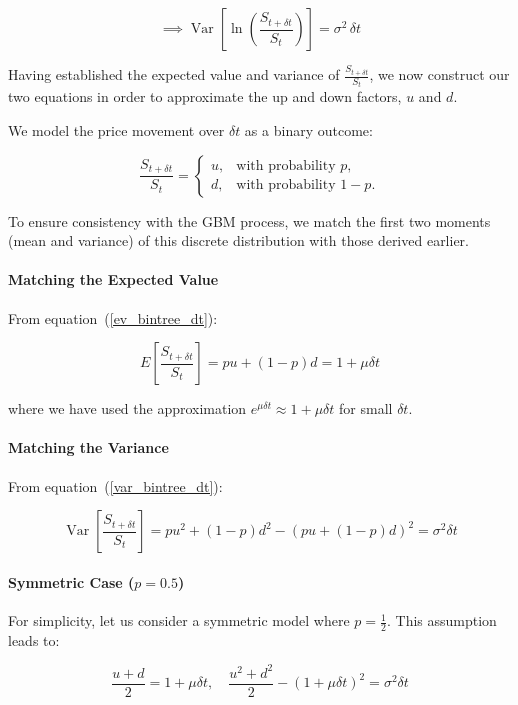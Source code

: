 \documentclass{article}
\begin{document}
    \begin{equation}
        \label{var_bintree_dt}
        \implies \operatorname{Var}\!\left[\ln\!\left(\frac{S_{t+\delta t}}{S_t}\right)\right] = \sigma^2\, \delta t
    \end{equation}

    Having established the expected value and variance of \( \frac{S_{t+\delta t}}{S_t} \), we now  construct our two equations in order to approximate the up and down factors, \( u \) and \( d \).

We model the price movement over \( \delta t \) as a binary outcome:

\[
    \frac{S_{t+\delta t}}{S_t} = 
    \begin{cases}
        u, & \text{with probability } p, \\
        d, & \text{with probability } 1 - p.
    \end{cases}
\]

To ensure consistency with the GBM process, we match the first two moments (mean and variance) of this discrete distribution with those derived earlier.

\paragraph{Matching the Expected Value}
From equation~(\ref{ev_bintree_dt}):

\[
    E\!\left[\frac{S_{t+\delta t}}{S_t}\right] = p u + (1 - p) d = 1 + \mu \delta t
\]

where we have used the approximation \( e^{\mu \delta t} \approx 1 + \mu \delta t \) for small \( \delta t \).

\paragraph{Matching the Variance}
From equation~(\ref{var_bintree_dt}):

\[
    \operatorname{Var}\!\left[\frac{S_{t+\delta t}}{S_t}\right] = p u^2 + (1 - p) d^2 - (p u + (1 - p) d)^2 = \sigma^2 \delta t
\]

\paragraph{Symmetric Case (\( p = 0.5 \))}
For simplicity, let us consider a symmetric model where \( p = \frac{1}{2} \). This assumption leads to:

\[
    \frac{u + d}{2} = 1 + \mu \delta t, \quad \frac{u^2 + d^2}{2} - \left(1 + \mu \delta t\right)^2 = \sigma^2 \delta t
\]
\end{document}
